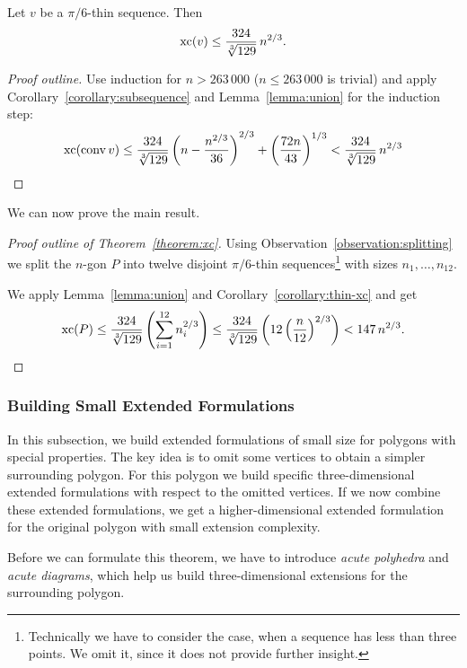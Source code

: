 \begin{corollary}\label{corollary:thin-xc}
  Let $v$ be a $\pi/6$-thin sequence. Then $$\operatorname{xc}(v) \leq \frac{324}{\sqrt[3]{129}}\,n^{2/3} .$$
\end{corollary}

\begin{proof}[Proof outline]
  Use induction for $n > 263\,000$ ($n \leq 263\,000$ is trivial) and apply Corollary~\ref{corollary:subsequence} and Lemma~\ref{lemma:union} for the induction step: $$\operatorname{xc}(\operatorname{conv} v) \leq \frac{324}{\sqrt[3]{129}} \left(n-\frac{n^{2/3}}{36}\right)^{2/3}+\left(\frac{72n}{43}\right)^{1/3} < \frac{324}{\sqrt[3]{129}}\,n^{2/3}$$
\end{proof}

We can now prove the main result.

\begin{proof}[Proof outline of Theorem~\ref{theorem:xc}]
  Using Observation~\ref{observation:splitting} we split the $n$-gon $P$ into twelve disjoint $\pi/6$-thin sequences\footnote{Technically we have to consider the case, when a sequence has less than three points. We omit it, since it does not provide further insight.} with sizes $n_1,\dots,n_{12}$.

  We apply Lemma~\ref{lemma:union} and Corollary~\ref{corollary:thin-xc} and get $$\operatorname{xc}(P)\leq\frac{324}{\sqrt[3]{129}}\left(\sum\limits_{i=1}^{12}n_i^{2/3}\right)\leq\frac{324}{\sqrt[3]{129}}\left(12\left(\frac{n}{12}\right)^{2/3}\right) < 147\,n^{2/3} .$$
\end{proof}



\subsubsection{Building Small Extended Formulations}

In this subsection, we build extended formulations of small size for polygons with special properties.
The key idea is to omit some vertices to obtain a simpler surrounding polygon. For this polygon we build specific three-dimensional extended formulations with respect to the omitted vertices. If we now combine these extended formulations, we get a higher-dimensional extended formulation for the original polygon with small extension complexity.

Before we can formulate this theorem, we have to introduce \emph{acute polyhedra} and \emph{acute diagrams}, which help us build three-dimensional extensions for the surrounding polygon.

